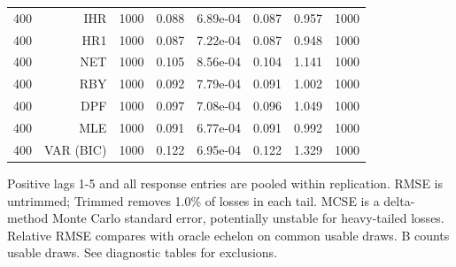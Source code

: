 \begin{table}[p]
\begin{tabular}{rrrrrrrr}
400 & IHR & 1000 & 0.088 & 6.89e-04 & 0.087 & 0.957 & 1000 \\
400 & HR1 & 1000 & 0.087 & 7.22e-04 & 0.087 & 0.948 & 1000 \\
400 & NET & 1000 & 0.105 & 8.56e-04 & 0.104 & 1.141 & 1000 \\
400 & RBY & 1000 & 0.092 & 7.79e-04 & 0.091 & 1.002 & 1000 \\
400 & DPF & 1000 & 0.097 & 7.08e-04 & 0.096 & 1.049 & 1000 \\
400 & MLE & 1000 & 0.091 & 6.77e-04 & 0.091 & 0.992 & 1000 \\
400 & VAR (BIC) & 1000 & 0.122 & 6.95e-04 & 0.122 & 1.329 & 1000 \\
\bottomrule\end{tabular}
\par\medskip
\begin{minipage}{0.98\linewidth}\footnotesize Positive lags 1-5 and all response entries are pooled within replication. RMSE is untrimmed; Trimmed removes 1.0\% of losses in each tail. MCSE is a delta-method Monte Carlo standard error, potentially unstable for heavy-tailed losses. Relative RMSE compares with oracle echelon on common usable draws. B counts usable draws. See diagnostic tables for exclusions.\end{minipage}
\end{table}
